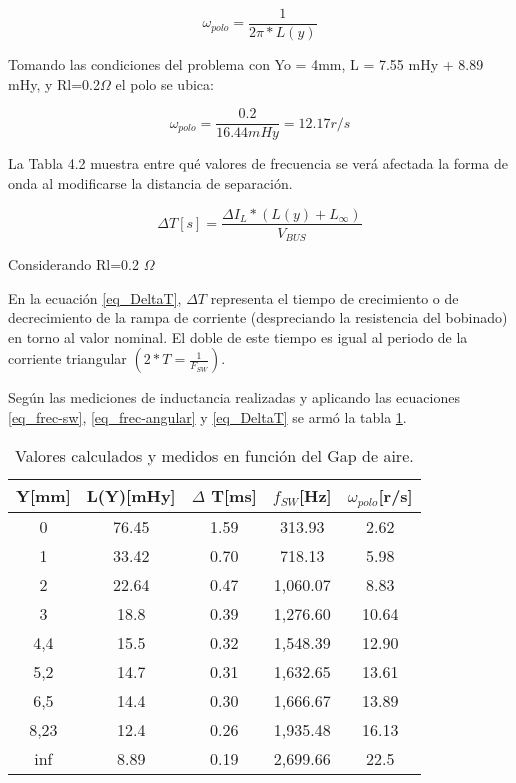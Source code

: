 \begin{equation} \label{eq_frec-angular}
	\omega _{polo} = \frac{1}{2\pi * L(y)}
\end{equation}

\noindent Tomando las condiciones del problema con Yo = 4mm, L = 7.55 mHy + 8.89 mHy, y Rl=0.2$\Omega$ el polo se ubica:

\begin{equation} 
	\omega _{polo} = \frac{0.2}{16.44 mHy} = 12.17 r/s
\end{equation}

\noindent La Tabla 4.2 muestra  entre qué valores de frecuencia se verá afectada la forma de onda al modificarse la distancia de separación.

\begin{equation} \label{eq_DeltaT}
	\Delta T [s] = \frac{\Delta I_L * (L(y) + L_{\infty})}{V_{BUS}}
\end{equation}


\noindent Considerando Rl=0.2 $\Omega$ 

\noindent En la ecuación \ref{eq_DeltaT}, $\Delta T$ representa el tiempo de crecimiento o de decrecimiento de la rampa de corriente (despreciando la resistencia del bobinado) en torno al valor nominal. El doble de este tiempo es igual al periodo de la corriente triangular $(2*T=\frac{1}{F_{SW}})$.

\noindent Según las mediciones de inductancia realizadas y aplicando las ecuaciones \ref{eq_frec-sw}, \ref{eq_frec-angular} y \ref{eq_DeltaT} se armó la tabla \ref{tab_mediciones}.


\begin{table}[H]
	\begin{center}
		\begin{tabular}{| c | c | c | c | c |}
			\hline
			Y[mm] & L(Y)[mHy] & $\Delta$ T[ms] & $f_{SW}$[Hz] & $\omega _{polo}$[r/s]\\ \hline
			0 & 76.45 & 1.59 & 313.93 & 2.62\\ \hline
			1 & 33.42 & 0.70 & 718.13 & 5.98\\ \hline
			2 & 22.64 &	0.47 & 1,060.07 & 8.83\\ \hline
			3 &	18.8 & 0.39 & 1,276.60 & 10.64\\ \hline
			4,4 & 15.5 & 0.32 & 1,548.39 & 12.90\\ \hline
			5,2 & 14.7 & 0.31 & 1,632.65 & 13.61\\ \hline
			6,5 & 14.4 & 0.30 & 1,666.67 & 13.89\\ \hline
			8,23 & 12.4 & 0.26 & 1,935.48 & 16.13\\ \hline
			inf & 8.89 & 0.19 & 2,699.66 & 22.5	\\ \hline
		\end{tabular}
		\caption{Valores calculados y medidos en función del Gap de aire.}
		\label{tab_mediciones}
	\end{center}
\end{table}

